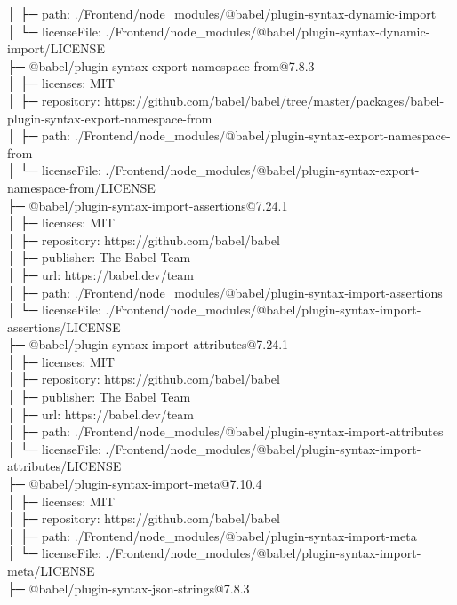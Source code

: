 │  ├─ path: ./Frontend/node\_modules/@babel/plugin-syntax-dynamic-import\\
│  └─ licenseFile: ./Frontend/node\_modules/@babel/plugin-syntax-dynamic-import/LICENSE\\
├─ @babel/plugin-syntax-export-namespace-from@7.8.3\\
│  ├─ licenses: MIT\\
│  ├─ repository: https://github.com/babel/babel/tree/master/packages/babel-plugin-syntax-export-namespace-from\\
│  ├─ path: ./Frontend/node\_modules/@babel/plugin-syntax-export-namespace-from\\
│  └─ licenseFile: ./Frontend/node\_modules/@babel/plugin-syntax-export-namespace-from/LICENSE\\
├─ @babel/plugin-syntax-import-assertions@7.24.1\\
│  ├─ licenses: MIT\\
│  ├─ repository: https://github.com/babel/babel\\
│  ├─ publisher: The Babel Team\\
│  ├─ url: https://babel.dev/team\\
│  ├─ path: ./Frontend/node\_modules/@babel/plugin-syntax-import-assertions\\
│  └─ licenseFile: ./Frontend/node\_modules/@babel/plugin-syntax-import-assertions/LICENSE\\
├─ @babel/plugin-syntax-import-attributes@7.24.1\\
│  ├─ licenses: MIT\\
│  ├─ repository: https://github.com/babel/babel\\
│  ├─ publisher: The Babel Team\\
│  ├─ url: https://babel.dev/team\\
│  ├─ path: ./Frontend/node\_modules/@babel/plugin-syntax-import-attributes\\
│  └─ licenseFile: ./Frontend/node\_modules/@babel/plugin-syntax-import-attributes/LICENSE\\
├─ @babel/plugin-syntax-import-meta@7.10.4\\
│  ├─ licenses: MIT\\
│  ├─ repository: https://github.com/babel/babel\\
│  ├─ path: ./Frontend/node\_modules/@babel/plugin-syntax-import-meta\\
│  └─ licenseFile: ./Frontend/node\_modules/@babel/plugin-syntax-import-meta/LICENSE\\
├─ @babel/plugin-syntax-json-strings@7.8.3\\
